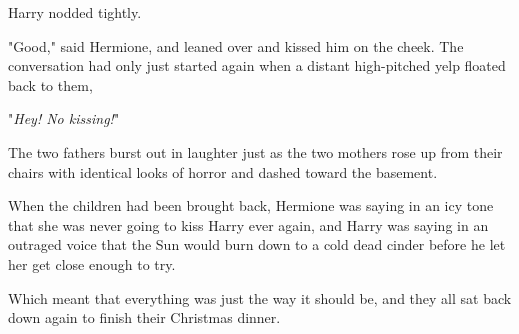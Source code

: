 Harry nodded tightly.

"Good," said Hermione, and leaned over and kissed him on the cheek.
\later
The conversation had only just started again when a distant high-pitched
yelp floated back to them,

"\emph{Hey! No kissing!}"

The two fathers burst out in laughter just as the two mothers rose up from
their chairs with identical looks of horror and dashed toward the basement.

When the children had been brought back, Hermione was saying in an icy tone
that she was never going to kiss Harry ever again, and Harry was saying in an
outraged voice that the Sun would burn down to a cold dead cinder before he let
her get close enough to try.

Which meant that everything was just the way it should be, and they all sat
back down again to finish their Christmas dinner.
